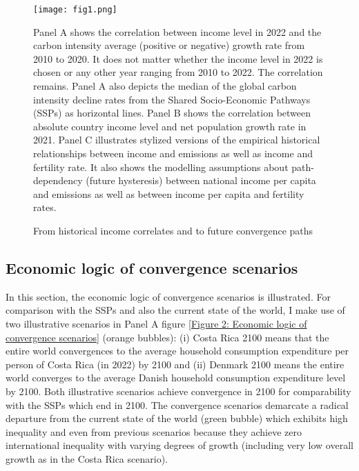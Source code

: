 \documentclass{article}
\begin{document}
\begin{figure}[hbt!]
\centering
 \texttt{[image: fig1.png]}
  \caption{From historical income correlates and to future convergence paths}
  \label{Figure 1: From historical income correlates and to future convergence paths}
  \medskip
\small 
Panel A shows the correlation between income level in 2022 and the carbon intensity average (positive or negative) growth rate from 2010 to 2020. It does not matter whether the income level in 2022 is chosen or any other year ranging from 2010 to 2022. The correlation remains. Panel A also depicts the median of the global carbon intensity decline rates from the Shared Socio-Economic Pathways (SSPs) as horizontal lines. Panel B shows the correlation between absolute country income level and net population growth rate in 2021. Panel C illustrates stylized versions of the empirical historical relationships between income and emissions as well as income and fertility rate. It also shows the modelling assumptions about path-dependency (future hysteresis) between national income per capita and emissions as well as between income per capita and fertility rates.
\end{figure}

\FloatBarrier

\subsection{Economic logic of convergence scenarios}

In this section, the economic logic of convergence scenarios is illustrated. For comparison with the SSPs and also the current state of the world, I make use of two illustrative scenarios in Panel A figure \ref{Figure 2: Economic logic of convergence scenarios} (orange bubbles): (i) Costa Rica 2100 means that the entire world convergences to the average household consumption expenditure per person of Costa Rica (in 2022) by 2100 and (ii) Denmark 2100 means the entire world converges to the average Danish household consumption expenditure level by 2100. Both illustrative scenarios achieve convergence in 2100 for comparability with the SSPs which end in 2100. The convergence scenarios demarcate a radical departure from the current state of the world (green bubble) which exhibits high inequality and even from previous scenarios because they achieve zero international inequality with varying degrees of growth (including very low overall growth as in the Costa Rica scenario).
\end{document}
